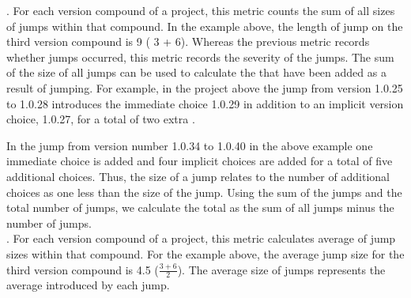 \documentclass[conference]{IEEEtran}
\begin{document}
.  For each version compound of a project, this metric counts the sum of all sizes of jumps within that compound. 
In the example above, the length of jump on the third version compound is 
9 ( 3 + 6). Whereas the previous metric records whether jumps occurred, this metric records the severity of the jumps. 
The sum of the size of all jumps can be used to calculate the \numberchoices that have been added as a result of jumping.
For example, in the project above the jump from version 1.0.25 to 1.0.28 introduces the immediate choice 1.0.29 in addition to an implicit version choice, 1.0.27, for a total of two extra \choices.

In the jump from version number 1.0.34 to 1.0.40 in the above example one immediate choice is added and four implicit choices are added for a total of five additional choices.
Thus, the size of a jump relates to the number of additional choices as one less than the size of the jump.
Using the sum of the jumps and the total number of jumps, we calculate the total \numberchoices as the sum of all jumps minus the number of jumps.\\

 
. For each version compound of a project, this metric calculates average of  jump sizes within that compound. 
For the example above, the average jump size for the third version compound is 4.5 ($\frac{ 3 + 6 }{2}$).
The average size of jumps represents the average \numberchoices introduced by each jump. 
\\

 


\end{document}
